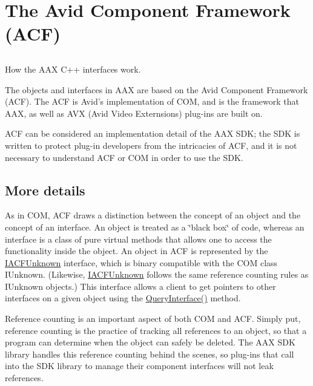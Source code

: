 \hypertarget{a00357}{}\section{The Avid Component Framework (A\+C\+F)}
\label{a00357}


\subsection{ }
How the A\+A\+X C++ interfaces work. 

The objects and interfaces in A\+A\+X are based on the Avid Component Framework (A\+C\+F). The A\+C\+F is Avid’s implementation of C\+O\+M, and is the framework that A\+A\+X, as well as A\+V\+X (Avid Video Externsions) plug-\/ins are built on.

A\+C\+F can be considered an implementation detail of the A\+A\+X S\+D\+K; the S\+D\+K is written to protect plug-\/in developers from the intricacies of A\+C\+F, and it is not necessary to understand A\+C\+F or C\+O\+M in order to use the S\+D\+K.\hypertarget{a00357_details}{}\subsection{More details}\label{a00357_details}
As in C\+O\+M, A\+C\+F draws a distinction between the concept of an object and the concept of an interface. An object is treated as a \char`\"{}black box\char`\"{} of code, whereas an interface is a class of pure virtual methods that allows one to access the functionality inside the object. An object in A\+C\+F is represented by the \hyperlink{a00146}{I\+A\+C\+F\+Unknown} interface, which is binary compatible with the C\+O\+M class I\+Unknown. (Likewise, \hyperlink{a00146}{I\+A\+C\+F\+Unknown} follows the same reference counting rules as I\+Unknown objects.) This interface allows a client to get pointers to other interfaces on a given object using the \hyperlink{a00146_a8b7f0ae9c78d007ca76aa462ebe53135}{Query\+Interface()} method.

Reference counting is an important aspect of both C\+O\+M and A\+C\+F. Simply put, reference counting is the practice of tracking all references to an object, so that a program can determine when the object can safely be deleted. The A\+A\+X S\+D\+K library handles this reference counting behind the scenes, so plug-\/ins that call into the S\+D\+K library to manage their component interfaces will not leak references.

